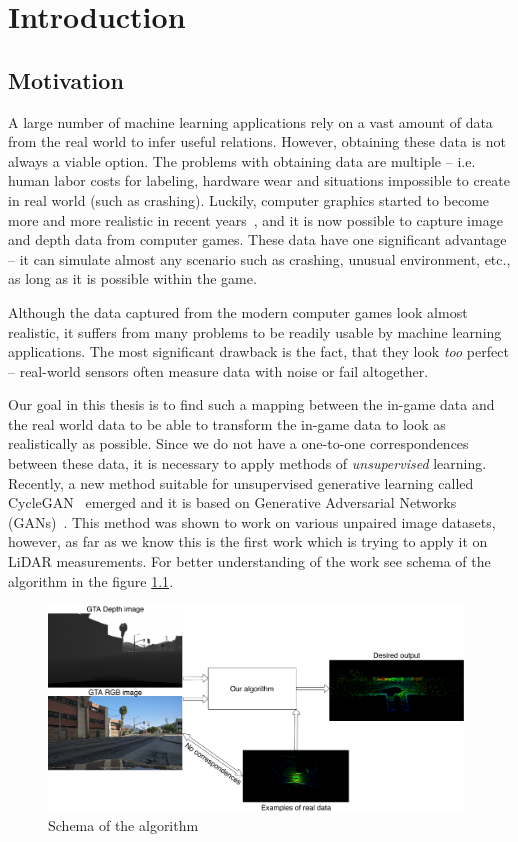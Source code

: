 \chapter{Introduction}

\section{Motivation}

A large number of machine learning applications rely on a vast amount of data from the real world to infer useful relations. However, obtaining these data is not always a viable option. The problems with obtaining data are multiple -- i.e. human labor costs for labeling, hardware wear and situations impossible to create in real world (such as crashing). Luckily, computer graphics started to become more and more realistic in recent years~\cite{matrix}, and it is now possible to capture image and depth data from computer games. These data have one significant advantage -- it can simulate almost any scenario such as crashing, unusual environment, etc., as long as it is possible within the game.

Although the data captured from the modern computer games look almost realistic, it suffers from many problems to be readily usable by machine learning applications. The most significant drawback is the fact, that they look {\em too} perfect -- real-world sensors often measure data with noise or fail altogether.

Our goal in this thesis is to find such a mapping between the in-game data and the real world data to be able to transform the in-game data to look as realistically as possible. Since we do not have a one-to-one correspondences between these data, it is necessary to apply methods of {\em unsupervised} learning. Recently, a new method suitable for unsupervised generative learning called CycleGAN~\cite{cyclegan} emerged and it is based on Generative Adversarial Networks (GANs)~\cite{origgan}. This method was shown to work on various unpaired image datasets, however, as far as we know this is the first work which is trying to apply it on LiDAR measurements. For better understanding of the work see schema of the algorithm in the figure \ref{schema}.

\begin{figure}
\centering
\includegraphics[keepaspectratio, width=0.98\textwidth]{img/algorithm.pdf}
\caption{Schema of the algorithm}
\label{schema}
\end{figure}

